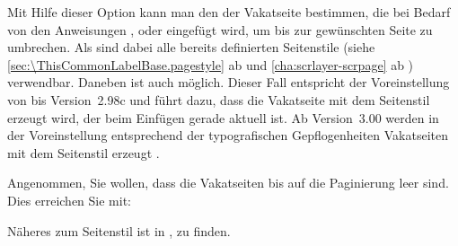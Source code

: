 \begin{Declaration}
\end{Declaration}%
Mit Hilfe dieser Option%
kann man den  der Vakatseite bestimmen, die bei Bedarf von
den Anweisungen ,
 oder
 eingefügt wird, um bis zur
gewünschten Seite zu umbrechen. Als  sind dabei alle bereits
definierten Seitenstile (siehe \autoref{sec:\ThisCommonLabelBase.pagestyle} ab
 und
\autoref{cha:scrlayer-scrpage} ab )
verwendbar. Daneben ist auch 
möglich. Dieser Fall entspricht der Voreinstellung von \KOMAScript{} bis
Version~2.98c und führt
dazu, dass die Vakatseite mit dem Seitenstil erzeugt wird, der beim Einfügen
gerade aktuell ist. Ab Version~3.00%
werden in der Voreinstellung entsprechend der
typografischen Gepflogenheiten Vakatseiten mit dem Seitenstil
erzeugt%
\iffalse %
, wenn man nicht Kompatibilität zu früheren \KOMAScript-Versionen
eingestellt hat (siehe Option \DescRef{\ThisCommonLabelBase.option.version},
\autoref{sec:\ThisCommonLabelBase.compatibilityOptions},
\DescPageRef{\ThisCommonLabelBase.option.version})%
\fi.%
  \begin{Example}
    Angenommen, Sie wollen, dass die Vakatseiten bis auf die Paginierung leer
    sind. Dies erreichen Sie mit:
\begin{lstcode}
\end{lstcode}
    Näheres zum Seitenstil 
    ist in 
    ,
     zu finden.
  \end{Example}
